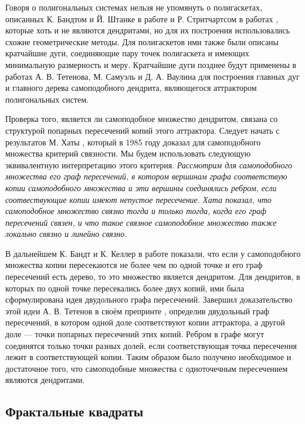 Говоря о полигональных системах нельзя не упомянуть о полигаскетах, описанных К. Бандтом и Й. Штанке в работе \cite{SSS6} и Р. Стритчартсом в работах \cite{strich1999, Strichartz1999}, которые хоть и не являются дендритами, но для их построения использовались схожие геометрические методы.
Для полигаскетов ими также были описаны кратчайшие дуги, соединяющие пару точек полигаскета и имеющих минимальную размерность и меру.
Кратчайшие дуги позднее будут применены в работах \cite{TSV2017, STV2017} А. В. Тетенова, М. Самуэль и Д. А. Ваулина для построения главных дуг и главного дерева самоподобного дендрита, являющегося аттрактором полигональных систем.

Проверка того, является ли самоподобное множество дендритом, связана со структурой попарных пересечений копий этого аттрактора.
Следует начать с результатов М. Хаты \cite{Hata1985}, который в 1985 году доказал для самоподобного множества критерий связности.
Мы будем использовать следующую эквивалентную интерпретацию этого критерия.
{\em Рассмотрим для самоподобного множества его граф пересечений, в котором вершинам графа соответствую копии самоподобного множества и эти вершины соединялись ребром, если соотвествующие копии имеют непустое пересечение.
Хата показал, что самоподобное множество связно тогда и только тогда, когда его граф пересечений связен, и что такое связное самоподобное множество также локально связно и линейно связно.}

В дальнейшем К. Бандт и К. Келлер в работе \cite{SSS2} показали, что если у самоподобного множества копии пересекаются не более чем по одной точке и его граф пересечений есть дерево, то это множество является дендритом. Для дендритов, в которых по одной точке пересекались более двух копий, ими была сформулирована идея двудольного графа пересечений. 
Завершил доказательство этой идеи А. В. Тетенов в своём препринте \cite{FIP}, определив двудольный граф пересечений, в котором одной доле соответствуют копии аттрактора, а другой доле --- точки попарных пересечений этих копий. Ребром в графе могут соединятся только точки разных долей, если соответствующая точка пересечения лежит в соответствующей копии.
Таким образом было получено необходимое и достаточное того, что самоподобные множества с одноточечным пересечением являются дендритами.\\


\subsection{Фрактальные квадраты}
\label{ssec:HFS}

